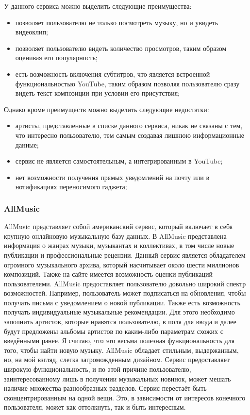 У данного сервиса можно выделить следующие преимущества:

\begin{itemize}
  \item позволяет пользователю не только посмотреть музыку, но и увидеть видеоклип;
  \item позволяет пользователю видеть количество просмотров, таким образом оценивая его популярность;
  \item есть возможность включения субтитров, что является встроенной функциональностью YouTube, таким образом позволяя пользователю сразу видеть текст композиции при условии его присутствия;
\end{itemize}

Однако кроме преимуществ можно выделить следующие недостатки:

\begin{itemize}
  \item артисты, представленные в списке данного сервиса, никак не связаны с тем, что интересно пользователю, тем самым создавая лишнюю информационные данные;
  \item сервис не является самостоятельным, а интегрированным в YouTube;
  \item нет возможности получения прямых уведомлений на почту или в нотификациях переносимого гаджета;
\end{itemize}

\subsubsection{AllMusic}
\label{sub:domain:analogues_review:allmusic}
AllMusic представляет собой американский сервис, который включает в себя крупную онлайновую музыкальную базу данных. В AllMusic представлена информация о жанрах музыки, музыкантах и коллективах, в том числе новые публикации и профессиональные рецензии. Данный сервис является обладателем огромного музыкального архива, который насчитывает около шести миллионов композиций. Также на сайте имеется возможность оценки публикаций пользователями.
AllMusic предоставляет пользователю довольно широкий спектр возможностей. Например, пользователь может подписаться на обновления, чтобы получать письма с уведомлением о новой публикации. Также есть возможность получать индивидуальные музыкальные рекомендации. Для этого необходимо заполнить артистов, которые нравятся пользователю, в поля для ввода и далее будут предложены альбомы артистов по каким-либо параметрам схожих с введёнными ранее. Я считаю, что это весьма полезная функциональность для того, чтобы найти новую музыку.
AllMusic обладает стильным, выдержанным, но, на мой взгляд, слегка загроможденным дизайном. Сервис предоставляет широкую функциональность, и по этой причине пользователю, заинтересованному лишь в получении музыкальных новинок, может мешать наличие множества разнообразных разделов. Сервис перестаёт быть сконцентрированным на одной вещи. Это, в зависимости от интересов конечного пользователя, может как оттолкнуть, так и быть интересным.

